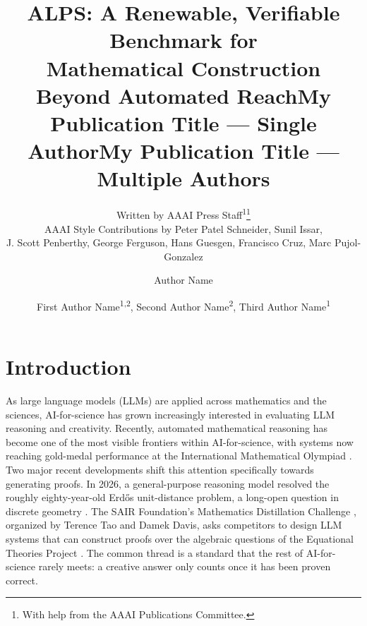\documentclass[letterpaper]{article} %
\title{ALPS: A Renewable, Verifiable Benchmark for \\ Mathematical Construction Beyond Automated Reach}
\author{
    Written by AAAI Press Staff\textsuperscript{\rm 1}\thanks{With help from the AAAI Publications Committee.}\\
    AAAI Style Contributions by Peter Patel Schneider,
    Sunil Issar,\\
    J. Scott Penberthy,
    George Ferguson,
    Hans Guesgen,
    Francisco Cruz\equalcontrib\corresponding,
    Marc Pujol-Gonzalez\equalcontrib\corresponding
}
\title{My Publication Title --- Single Author}
\author {
    Author Name
}
\title{My Publication Title --- Multiple Authors}
\author {
    First Author Name\textsuperscript{\rm 1,\rm 2}\equalcontrib,
    Second Author Name\textsuperscript{\rm 2}\equalcontrib,
    Third Author Name\textsuperscript{\rm 1}\corresponding
}
\begin{document}
\maketitle

\begin{abstract}

\end{abstract}


\section{Introduction}


As large language models (LLMs) are applied across mathematics and the sciences, AI-for-science has grown increasingly interested in evaluating LLM reasoning and creativity. Recently, automated mathematical reasoning has become one of the most visible frontiers within AI-for-science, with systems now reaching gold-medal performance at the International Mathematical Olympiad \citep{deepmind2025imo}. Two major recent developments shift this attention specifically towards generating proofs. In 2026, a general-purpose reasoning model resolved the roughly eighty-year-old Erdős unit-distance problem, a long-open question in discrete geometry \citep{openai2026unitdistance}. The SAIR Foundation's Mathematics Distillation Challenge \citep{tao2026distillation}, organized by Terence Tao and Damek Davis, asks competitors to design LLM systems that can construct proofs over the algebraic questions of the Equational Theories Project \citep{bolan2025equational}. The common thread is a standard that the rest of AI-for-science rarely meets: a creative answer only counts once it has been proven correct. 


\end{document}
